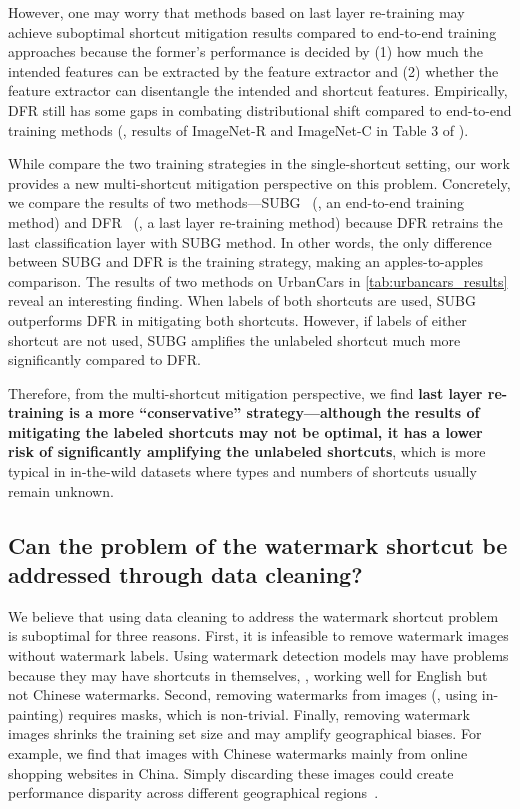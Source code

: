 \documentclass[10pt,twocolumn,letterpaper]{article}
\begin{document}
However, one may worry that methods based on last layer re-training may achieve suboptimal shortcut mitigation results compared to end-to-end training approaches because the former's performance is decided by (1) how much the intended features can be extracted by the feature extractor and (2) whether the feature extractor can disentangle the intended and shortcut features. Empirically, DFR still has some gaps in combating distributional shift compared to end-to-end training methods (\eg, results of ImageNet-R and ImageNet-C in Table 3 of \cite{kirichenko2022Last}).

While \citet{kirichenko2022Last} compare the two training strategies in the single-shortcut setting, our work provides a new multi-shortcut mitigation perspective on this problem. Concretely, we compare the results of two methods---SUBG~\cite{idrissi2022Conf.CausalLearn.Reason.Simple} (\ie, an end-to-end training method) and DFR~\cite{kirichenko2022Last} (\ie, a last layer re-training method) because DFR retrains the last classification layer with SUBG method. In other words, the only difference between SUBG and DFR is the training strategy, making an apples-to-apples comparison. The results of two methods on UrbanCars in \cref{tab:urbancars_results} reveal an interesting finding. When labels of both shortcuts are used, SUBG outperforms DFR in mitigating both shortcuts. However, if labels of either shortcut are not used, SUBG amplifies the unlabeled shortcut much more significantly compared to DFR.

Therefore, from the multi-shortcut mitigation perspective, we find \textbf{last layer re-training is a more ``conservative'' strategy---although the results of mitigating the labeled shortcuts may not be optimal, it has a lower risk of significantly amplifying the unlabeled shortcuts}, which is more typical in in-the-wild datasets where types and numbers of shortcuts usually remain unknown.

\subsection{Can the problem of the watermark shortcut be addressed through data cleaning?}

We believe that using data cleaning to address the watermark shortcut problem is suboptimal for three reasons. First, it is infeasible to remove watermark images without watermark labels. Using watermark detection models may have problems because they may have shortcuts in themselves, \eg, working well for English but not Chinese watermarks. Second, removing watermarks from images (\eg, using in-painting) requires masks, which is non-trivial. Finally, removing watermark images shrinks the training set size and may amplify geographical biases. For example, we find that images with Chinese watermarks mainly from online shopping websites in China. Simply discarding these images could create performance disparity across different geographical regions~\cite{Vries_2019_CVPR_Workshops,rojas2022the}.
\end{document}

